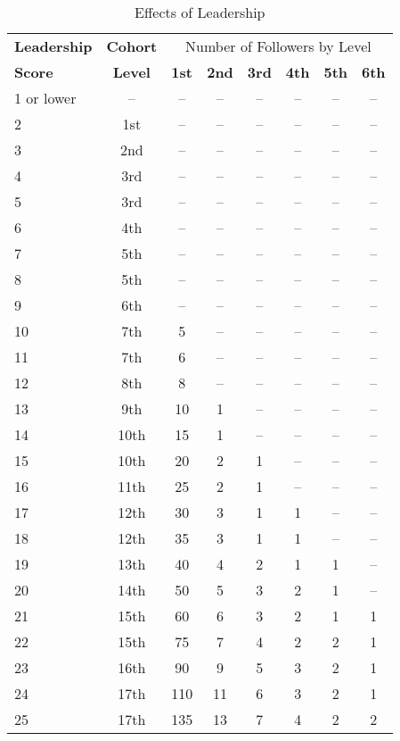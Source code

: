 \begin{table}[htb]
\sffamily
\caption{Effects of Leadership}
\begin{tabular}{lc*{6}{c}}
\textbf{Leadership} & \textbf{Cohort} & \multicolumn{6}{c}{Number of Followers by Level} \\
\textbf{Score} & \textbf{Level} & \textbf{1st} & \textbf{2nd} & \textbf{3rd} & \textbf{4th} & \textbf{5th} & \textbf{6th}\\
1 or lower & -- & -- & -- & -- & -- & -- & --\\
2 & 1st & -- & -- & -- & -- & -- & --\\
3 & 2nd & -- & -- & -- & -- & -- & --\\
4 & 3rd & -- & -- & -- & -- & -- & --\\
5 & 3rd & -- & -- & -- & -- & -- & --\\
6 & 4th & -- & -- & -- & -- & -- & --\\
7 & 5th & -- & -- & -- & -- & -- & --\\
8 & 5th & -- & -- & -- & -- & -- & --\\
9 & 6th & -- & -- & -- & -- & -- & --\\
10 & 7th & 5 & -- & -- & -- & -- & --\\
11 & 7th & 6 & -- & -- & -- & -- & --\\
12 & 8th & 8 & -- & -- & -- & -- & --\\
13 & 9th & 10 & 1 & -- & -- & -- & --\\
14 & 10th & 15 & 1 & -- & -- & -- & --\\
15 & 10th & 20 & 2 & 1 & -- & -- & --\\
16 & 11th & 25 & 2 & 1 & -- & -- & --\\
17 & 12th & 30 & 3 & 1 & 1 & -- & --\\
18 & 12th & 35 & 3 & 1 & 1 & -- & --\\
19 & 13th & 40 & 4 & 2 & 1 & 1 & --\\
20 & 14th & 50 & 5 & 3 & 2 & 1 & --\\
21 & 15th & 60 & 6 & 3 & 2 & 1 & 1\\
22 & 15th & 75 & 7 & 4 & 2 & 2 & 1\\
23 & 16th & 90 & 9 & 5 & 3 & 2 & 1\\
24 & 17th & 110 & 11 & 6 & 3 & 2 & 1\\
25 & 17th & 135 & 13 & 7 & 4 & 2 & 2\\
\end{tabular}
\end{table}

